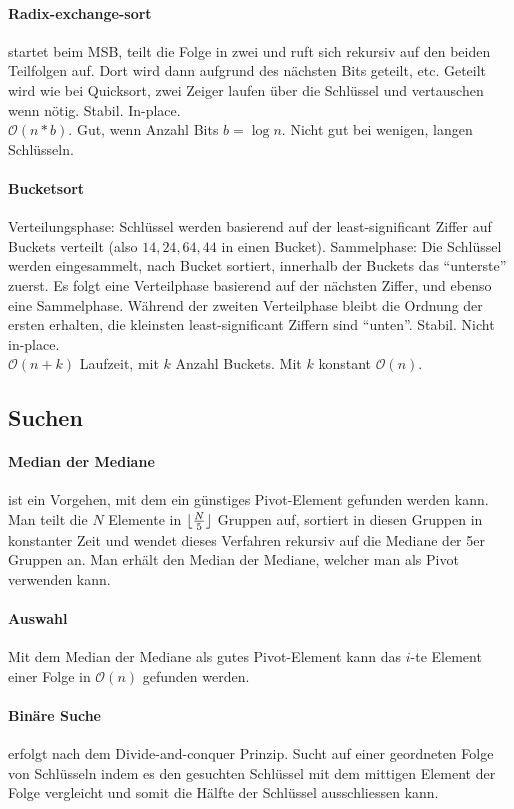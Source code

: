 \documentclass[a4paper, 9pt, DIV=20]{scrartcl}
\DeclarePairedDelimiter{\floor}{\lfloor}{\rfloor}
\newcommand{\Oh}{\mathcal{O}}
\begin{document}
\paragraph{Radix-exchange-sort} startet beim MSB, teilt die Folge in zwei und ruft sich rekursiv auf den beiden Teilfolgen auf. Dort wird dann aufgrund des nächsten Bits geteilt, etc. Geteilt wird wie bei Quicksort, zwei Zeiger laufen über die Schlüssel und vertauschen wenn nötig. Stabil. In-place. \\
$\Oh(n * b)$. Gut, wenn Anzahl Bits $b = \log{n}$. Nicht gut bei wenigen, langen Schlüsseln.

\paragraph{Bucketsort} Verteilungsphase: Schlüssel werden basierend auf der least-significant Ziffer auf Buckets verteilt (also $14, 24, 64, 44$ in einen Bucket). Sammelphase: Die Schlüssel werden eingesammelt, nach Bucket sortiert, innerhalb der Buckets das ``unterste'' zuerst. Es folgt eine Verteilphase basierend auf der nächsten Ziffer, und ebenso eine Sammelphase. Während der zweiten Verteilphase bleibt die Ordnung der ersten erhalten, die kleinsten least-significant Ziffern sind ``unten''. Stabil. Nicht in-place. \\
$\Oh(n+k)$ Laufzeit, mit $k$ Anzahl Buckets. Mit $k$ konstant $\Oh(n)$.

\subsection{Suchen}
\paragraph{Median der Mediane} ist ein Vorgehen, mit dem ein günstiges Pivot-Element gefunden werden kann. Man teilt die $N$ Elemente in $\floor{\frac{N}{5}}$ Gruppen auf, sortiert in diesen Gruppen in konstanter Zeit und wendet dieses Verfahren rekursiv auf die Mediane der 5er Gruppen an. Man erhält den Median der Mediane, welcher man als Pivot verwenden kann.

\paragraph{Auswahl} Mit dem Median der Mediane als gutes Pivot-Element kann das $i$-te Element einer Folge in $\Oh(n)$ gefunden werden.

\paragraph{Binäre Suche} erfolgt nach dem Divide-and-conquer Prinzip. Sucht auf einer geordneten Folge von Schlüsseln indem es den gesuchten Schlüssel mit dem mittigen Element der Folge vergleicht und somit die Hälfte der Schlüssel ausschliessen kann.
\end{document}
